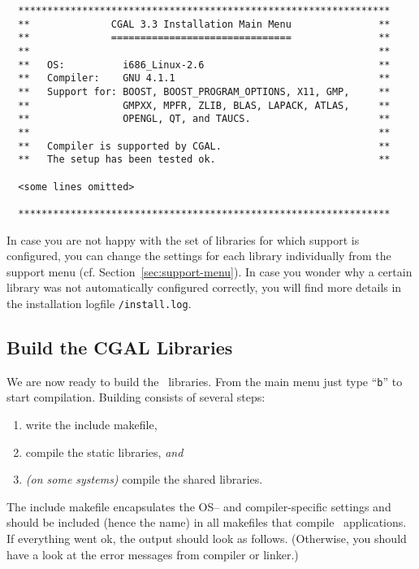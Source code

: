 {\ccTexHtml{\scriptsize}{}
\begin{verbatim}
  ****************************************************************
  **              CGAL 3.3 Installation Main Menu               **
  **              ===============================               **
  **                                                            **
  **   OS:          i686_Linux-2.6                              **
  **   Compiler:    GNU 4.1.1                                   **
  **   Support for: BOOST, BOOST_PROGRAM_OPTIONS, X11, GMP,     **
  **                GMPXX, MPFR, ZLIB, BLAS, LAPACK, ATLAS,     **
  **                OPENGL, QT, and TAUCS.                      **
  **                                                            **
  **   Compiler is supported by CGAL.                           **
  **   The setup has been tested ok.                            **

  <some lines omitted>

  ****************************************************************
\end{verbatim}
}

In case you are not happy with the set of libraries for which support
is configured, you can change the settings for each library
individually from the support menu (cf.
Section~\ref{sec:support-menu}). In case you wonder why a certain
library was not automatically configured correctly, you will find more
details in the installation logfile \texttt{\cgaldir/install.log}.

\subsection{Build the CGAL Libraries\label{sec:build-the-libs}}

We are now ready to build the \cgal\ libraries. From the main menu
just type ``{\tt b}'' to start compilation. Building consists of
several steps:
\begin{enumerate}
\item write the include makefile,
\item compile the static libraries, \textit{and}
\item \textit{(on some systems)} compile the shared libraries.
\end{enumerate}
The include makefile encapsulates the OS-- and
compiler-specific settings and should be included (hence the name) in
all makefiles that compile \cgal\ applications. If everything went ok,
the output should look as follows. (Otherwise, you should have a look
at the error messages from compiler or linker.)

